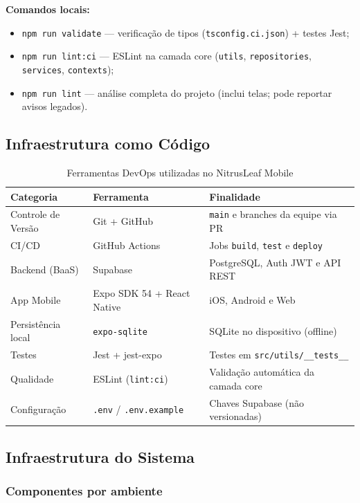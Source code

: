 \documentclass[11pt,a4paper]{article}
\begin{document}
\textbf{Comandos locais:}
\begin{itemize}[leftmargin=*, nosep]
    \item \texttt{npm run validate} --- verificação de tipos (\texttt{tsconfig.ci.json}) + testes Jest;
    \item \texttt{npm run lint:ci} --- ESLint na camada core (\texttt{utils}, \texttt{repositories}, \texttt{services}, \texttt{contexts});
    \item \texttt{npm run lint} --- análise completa do projeto (inclui telas; pode reportar avisos legados).
\end{itemize}

\subsection{Infraestrutura como Código}

\begin{table}[H]
\centering
\caption{Ferramentas DevOps utilizadas no NitrusLeaf Mobile}
\label{tab:devops-tools}
\begin{tabular}{|l|l|p{6cm}|}
\hline
\textbf{Categoria} & \textbf{Ferramenta} & \textbf{Finalidade} \\
\hline
Controle de Versão & Git + GitHub & \texttt{main} e branches da equipe via PR \\
CI/CD & GitHub Actions & Jobs \texttt{build}, \texttt{test} e \texttt{deploy} \\
Backend (BaaS) & Supabase & PostgreSQL, Auth JWT e API REST \\
App Mobile & Expo SDK 54 + React Native & iOS, Android e Web \\
Persistência local & \texttt{expo-sqlite} & SQLite no dispositivo (offline) \\
Testes & Jest + jest-expo & Testes em \texttt{src/utils/\_\_tests\_\_} \\
Qualidade & ESLint (\texttt{lint:ci}) & Validação automática da camada core \\
Configuração & \texttt{.env} / \texttt{.env.example} & Chaves Supabase (não versionadas) \\
\hline
\end{tabular}
\end{table}

\subsection{Infraestrutura do Sistema}

\subsubsection{Componentes por ambiente}
\end{document}
